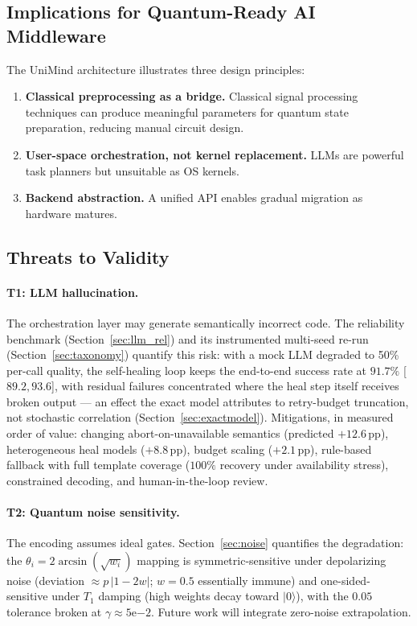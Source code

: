 ﻿\documentclass[12pt,a4paper]{article}
\begin{document}
\subsection{Implications for Quantum-Ready AI Middleware}

The UniMind architecture illustrates three design principles:

\begin{enumerate}[leftmargin=2em]
    \item \textbf{Classical preprocessing as a bridge.} Classical signal processing techniques can produce meaningful parameters for quantum state preparation, reducing manual circuit design.
    \item \textbf{User-space orchestration, not kernel replacement.} LLMs are powerful task planners but unsuitable as OS kernels.
    \item \textbf{Backend abstraction.} A unified API enables gradual migration as hardware matures.
\end{enumerate}

\subsection{Threats to Validity}\label{sec:threats}

\paragraph{T1: LLM hallucination.} The orchestration layer may generate semantically incorrect code. The reliability benchmark (Section~\ref{sec:llm_rel}) and its instrumented multi-seed re-run (Section~\ref{sec:taxonomy}) quantify this risk: with a mock LLM degraded to 50\% per-call quality, the self-healing loop keeps the end-to-end success rate at $91.7\%$ [$89.2, 93.6$], with residual failures concentrated where the heal step itself receives broken output --- an effect the exact model attributes to retry-budget truncation, not stochastic correlation (Section~\ref{sec:exactmodel}). Mitigations, in measured order of value: changing abort-on-unavailable semantics (predicted $+12.6$\,pp), heterogeneous heal models ($+8.8$\,pp), budget scaling ($+2.1$\,pp), rule-based fallback with full template coverage ($100\%$ recovery under availability stress), constrained decoding, and human-in-the-loop review.

\paragraph{T2: Quantum noise sensitivity.} The encoding assumes ideal gates. Section~\ref{sec:noise} quantifies the degradation: the $\theta_i = 2\arcsin(\sqrt{w_i})$ mapping is symmetric-sensitive under depolarizing noise (deviation $\approx p\,|1-2w|$; $w=0.5$ essentially immune) and one-sided-sensitive under $T_1$ damping (high weights decay toward $|0\rangle$), with the $0.05$ tolerance broken at $\gamma \approx 5\mathrm{e}{-2}$. Future work will integrate zero-noise extrapolation.
\end{document}
